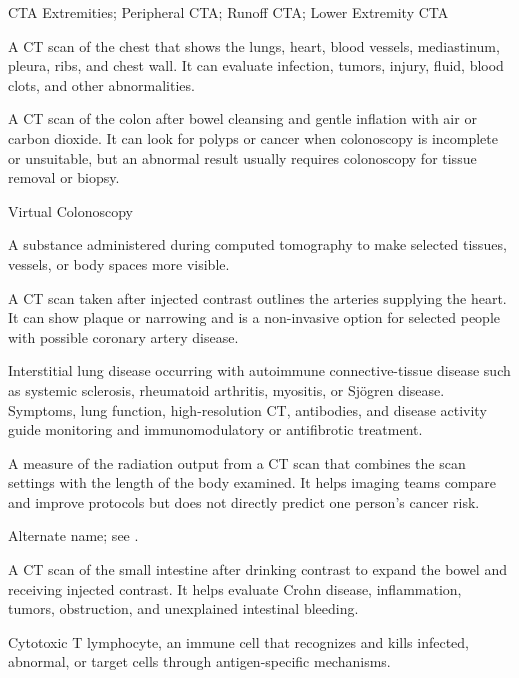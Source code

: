 
\synonyms
CTA Extremities; Peripheral CTA; Runoff CTA; Lower Extremity CTA

 A CT scan of the chest that shows the lungs, heart, blood vessels, mediastinum, pleura, ribs, and chest wall. It can evaluate infection, tumors, injury, fluid, blood clots, and other abnormalities.

 A CT scan of the colon after bowel cleansing and gentle inflation with air or carbon dioxide. It can look for polyps or cancer when colonoscopy is incomplete or unsuitable, but an abnormal result usually requires colonoscopy for tissue removal or biopsy.

\synonyms
Virtual Colonoscopy

 A substance administered during computed tomography to make selected tissues, vessels, or body spaces more visible.

 A CT scan taken after injected contrast outlines the arteries supplying the heart. It can show plaque or narrowing and is a non-invasive option for selected people with possible coronary artery disease.

 Interstitial lung disease occurring with autoimmune connective-tissue disease such as systemic sclerosis, rheumatoid arthritis, myositis, or Sjögren disease. Symptoms, lung function, high-resolution CT, antibodies, and disease activity guide monitoring and immunomodulatory or antifibrotic treatment.

 A measure of the radiation output from a CT scan that combines the scan settings with the length of the body examined. It helps imaging teams compare and improve protocols but does not directly predict one person's cancer risk.

 Alternate name; see .

 A CT scan of the small intestine after drinking contrast to expand the bowel and receiving injected contrast. It helps evaluate Crohn disease, inflammation, tumors, obstruction, and unexplained intestinal bleeding.

 Cytotoxic T lymphocyte, an immune cell that recognizes and kills infected, abnormal, or target cells through antigen-specific mechanisms.

